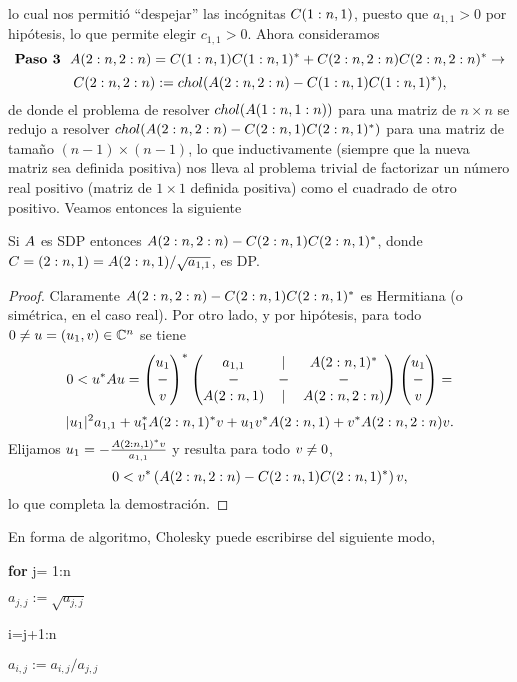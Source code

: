 \begin{tcolorbox}
lo cual nos permitió ``despejar'' las incógnitas $\Cb(1:n,1)$, puesto que
$a_{1,1}>0$ por hipótesis, lo que permite elegir $c_{1,1}>0$. Ahora consideramos
$$
\mbox{\bf Paso 3} \ \ \Ab(2:n,2:n)=\Cb(1:n,1)\Cb(1:n,1)^*+\Cb(2:n,2:n)\Cb(2:n,2:n)^* \to $$
$$\Cb(2:n,2:n):= chol(\Ab(2:n,2:n)-\Cb(1:n,1)\Cb(1:n,1)^*),
$$
de donde el problema de resolver
$chol(\Ab(1:n,1:n))$ para una matriz de $n\times n$  se redujo
a resolver $chol(\Ab(2:n,2:n)-\Cb(2:n,1)\Cb(2:n,1)^*)$ para una matriz de tamaño $(n-1)\times (n-1)$, lo que inductivamente (siempre que la nueva matriz sea definida positiva) nos lleva al problema trivial de factorizar un número real positivo (matriz de $1\times 1$ definida positiva) como el cuadrado de otro positivo. Veamos entonces la siguiente
\tcc
\begin{prop}
 Si $\Ab$ es SDP entonces $\Ab(2:n,2:n)-\Cb(2:n,1)\Cb(2:n,1)^*$, donde
 $\Cb=(2:n,1)=\Ab(2:n,1)/\sqrt{a_{1,1}}$, es DP.
\end{prop}
\etcc
\begin{proof}
Claramente $\Ab(2:n,2:n)-\Cb(2:n,1)\Cb(2:n,1)^*$ es Hermitiana (o simétrica, en el caso real). Por otro lado, y por hipótesis, para todo $\cero\neq \ub=(u_1,\vb)\in \Cn$ se tiene
 $$
 0<\ub^*\Ab\ub=
 \begin{pmatrix}
  u_1\\
  -\\
  \vb
 \end{pmatrix}^*
\begin{pmatrix}
 a_{1,1}&|&\Ab(2:n,1)^* \\
 -&-&-\\
 \Ab(2:n,1)&|&\Ab(2:n,2:n)
\end{pmatrix}
 \begin{pmatrix}
  u_1\\
  -\\
  \vb
 \end{pmatrix}=
 $$
 $$
 |u_1|^2 a_{1,1}+u_1^{*}\Ab(2:n,1)^{*}\vb +u_1\vb^*\Ab(2:n,1)+\vb^*\Ab(2:n,2:n)\vb.
 $$
 Elijamos $u_1=-\frac{\Ab(2:n,1)^*\vb}{a_{1,1}}$ y resulta para todo $\vb\neq \cero$,
 $$
 0<\vb^*\left( \Ab(2:n,2:n)-\Cb(2:n,1)\Cb(2:n,1)^*\right)\vb,
 $$
 lo que completa la demostración.
\end{proof}
En forma de algoritmo, Cholesky puede
escribirse del siguiente modo,

{\bf for} j= 1:n

\qquad $a_{j,j}:=\sqrt{a_{j,j}}$

 i=j+1:n

\qquad \qquad $a_{i,j}:=a_{i,j}/a_{j,j}$



\end{tcolorbox}

